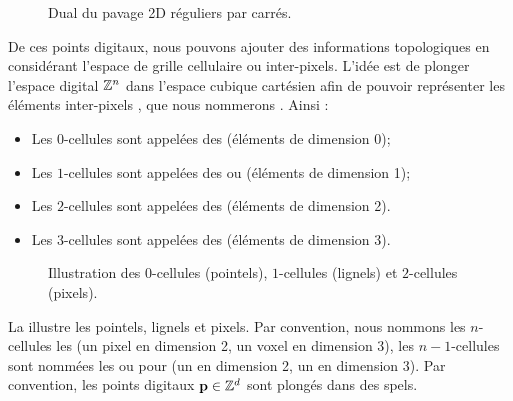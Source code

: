 \begin{figure}[ht]
  \begin{center}
    
    \caption{Dual du pavage 2D réguliers par carrés.\label{fig:pavage_dual}}
  \end{center}
\end{figure}

De ces points digitaux, nous pouvons ajouter des informations topologiques en
considérant l'espace de grille cellulaire ou inter-pixels. L'idée est de plonger
l'espace digital $\mathbb{Z}^n$ dans l'espace cubique cartésien afin de pouvoir
représenter les éléments inter-pixels \cite{Kovalesvsky1989, Khalimsky1990,
Francon1991}, que nous nommerons . Ainsi :
%
\begin{itemize}
%
  \item Les $0$-cellules sont appelées des  (éléments
  de dimension 0);
%
  \item Les $1$-cellules sont appelées des  ou
   (éléments de dimension 1);
%
  \item Les $2$-cellules sont appelées des  (éléments de
  dimension 2).
%
  \item Les $3$-cellules sont appelées des  (éléments de
  dimension 3).
%
\end{itemize}

\begin{figure}[ht]
  \begin{center}
    
    \caption{Illustration des $0$-cellules (pointels), $1$-cellules (lignels) et
    $2$-cellules (pixels).\label{fig:notations_topo}}
  \end{center}
\end{figure}

La  illustre les pointels, lignels et pixels. Par
convention, nous nommons les $n$-cellules les  (un pixel en
dimension 2, un voxel en dimension 3), les $n-1$-cellules sont nommées les
 ou  pour  (un
 en dimension 2, un  en dimension 3). Par
convention, les points digitaux $\mathbf{p} \in \mathbb{Z}^d$ sont plongés dans des
spels.


